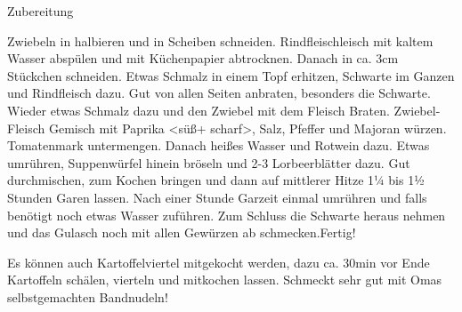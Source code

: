 {\Large Zubereitung} \newline
\begin{addmargin}[1cm]{0cm}
	Zwiebeln in halbieren und in Scheiben schneiden. Rindfleischleisch mit kaltem Wasser abspülen und
	mit Küchenpapier abtrocknen. Danach in ca. 3cm Stückchen schneiden.\newline
	Etwas Schmalz in einem Topf erhitzen, Schwarte im Ganzen und Rindfleisch dazu. Gut von allen Seiten
	anbraten, besonders die Schwarte.\newline
	Wieder etwas Schmalz dazu und den Zwiebel mit dem Fleisch Braten.\newline
	Zwiebel-Fleisch Gemisch mit Paprika <süß+ scharf>, Salz, Pfeffer und Majoran würzen. Tomatenmark
	untermengen.\newline
	Danach heißes Wasser und Rotwein dazu.\newline
	Etwas umrühren, Suppenwürfel hinein bröseln und 2-3 Lorbeerblätter dazu.\newline
	Gut durchmischen, zum Kochen bringen und dann auf mittlerer Hitze 11⁄4 bis 11⁄2 Stunden Garen lassen.\newline
	Nach einer Stunde Garzeit einmal umrühren und falls benötigt noch etwas Wasser zuführen.\newline
	Zum Schluss die Schwarte heraus nehmen und das Gulasch noch mit allen Gewürzen ab schmecken.\newline Fertig!\newline\newline
	
	Es können auch Kartoffelviertel mitgekocht werden, dazu ca. 30min vor Ende Kartoffeln schälen,
	vierteln und mitkochen lassen.\newline
	Schmeckt sehr gut mit Omas selbstgemachten Bandnudeln!
	
\end{addmargin}
